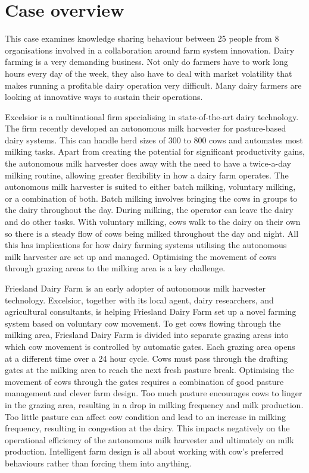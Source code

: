 


\section{Case overview}

This case examines knowledge sharing behaviour between 25 people from 8 organisations involved in a collaboration around farm system innovation. Dairy farming is a very demanding business. Not only do farmers have to work long hours every day of the week, they also have to deal with market volatility that makes running a profitable dairy operation very difficult. Many dairy farmers are looking at innovative ways to sustain their operations.\medskip

Excelsior is a multinational firm specialising in state-of-the-art dairy technology. The firm recently developed an autonomous milk harvester for pasture-based dairy systems. This can handle herd sizes of 300 to 800 cows and automates most milking tasks. Apart from creating the potential for significant productivity gains, the autonomous milk harvester does away with the need to have a twice-a-day milking routine, allowing greater flexibility in how a dairy farm operates. The autonomous milk harvester is suited to either batch milking, voluntary milking, or a combination of both. Batch milking involves bringing the cows in groups to the dairy throughout the day. During milking, the operator can leave the dairy and do other tasks. With voluntary milking, cows walk to the dairy on their own so there is a steady flow of cows being milked throughout the day and night. All this has implications for how dairy farming systems utilising the autonomous milk harvester are set up and managed. Optimising the movement of cows through grazing areas to the milking area is a key challenge. \medskip

Friesland Dairy Farm is an early adopter of autonomous milk harvester technology. Excelsior, together with its local agent, dairy researchers, and agricultural consultants, is helping Friesland Dairy Farm set up a novel farming system based on voluntary cow movement. To get cows flowing through the milking area, Friesland Dairy Farm is divided into separate grazing areas into which cow movement is controlled by automatic gates. Each grazing area opens at a different time over a 24 hour cycle. Cows must pass through the drafting gates at the milking area to reach the next fresh pasture break. Optimising the movement of cows through the gates requires a combination of good pasture management and clever farm design. Too much pasture encourages cows to linger in the grazing area, resulting in a drop in milking frequency and milk production. Too little pasture can affect cow condition and lead to an increase in milking frequency, resulting in congestion at the dairy. This impacts negatively on the operational efficiency of the autonomous milk harvester and ultimately on milk production. Intelligent farm design is all about working with cow's preferred behaviours rather than forcing them into anything. \medskip


